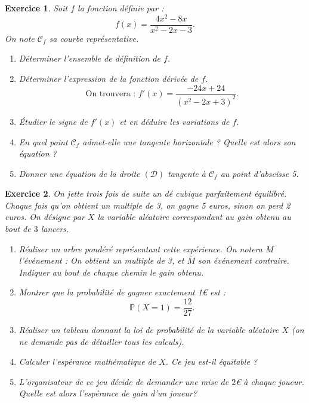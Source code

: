 \documentclass[10pt]{article}
\theoremstyle{exostyle}
\newtheorem{exercice}{Exercice}
\begin{document}
\begin{exercice}
    Soit $f$ la fonction définie par :
    \[
        f(x)=\dfrac{4x^2-8x}{x^2-2x-3}.
    \]
    On note $\mathcal{C}_f$ sa courbe représentative.
    \begin{enumerate}
        \item Déterminer l'ensemble de définition de $f$.
        \item Déterminer l'expression de la fonction dérivée de $f$.
              \[
                  \text{On trouvera :    } f'(x)=\dfrac{-24x+24}{(x^2-2x+3)^2}.
              \]
        \item \'Etudier le signe de $f'(x)$ et en déduire les variations de $f$.
        \item En quel point $\mathcal{C}_f$ admet-elle une tangente horizontale ? Quelle est alors son équation ?
        \item Donner une équation de la droite $(\mathcal{D})$ tangente à $\mathcal{C}_f$ au point d'abscisse 5.
    \end{enumerate}
\end{exercice}


\begin{exercice}
    On jette trois fois de suite un dé cubique parfaitement équilibré. Chaque fois qu'on obtient un multiple de 3, on gagne 5 euros, sinon on perd 2 euros. On désigne par $X$ la variable aléatoire correspondant au gain obtenu au bout de $3$ lancers.
    \begin{enumerate}
        \item Réaliser un arbre pondéré représentant cette expérience. On notera $M$ l'événement : \og On obtient un multiple de 3\fg{}, et $\bar{M}$ son événement contraire. Indiquer au bout de chaque chemin le gain obtenu.
        \item Montrer que la probabilité de gagner exactement 1\euro{} est :
              \[ \mathbb{P}(X=1)=\dfrac{12}{27}.
              \]
        \item Réaliser un tableau donnant la loi de probabilité de la variable aléatoire $X$ (\emph{on ne demande pas de détailler tous les calculs).}
        \item Calculer l'espérance mathématique de $X$. Ce jeu est-il équitable ?
        \item L'organisateur de ce jeu décide de demander une mise de $2$\euro{} à chaque joueur. Quelle est alors l'espérance de gain d'un joueur?
    \end{enumerate}
\end{exercice}
\end{document}
